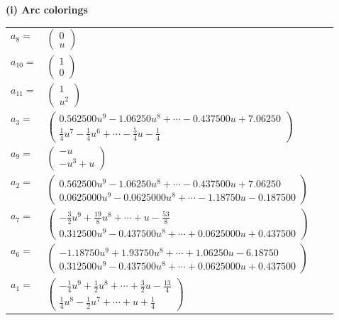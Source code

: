 \documentclass[1p]{elsarticle_modified}
\theoremstyle{definition}
\begin{document}
\flushleft \textbf{(i) Arc colorings}\\
\begin{tabular}{m{7pt} m{180pt} m{7pt} m{180pt} }
\flushright $a_{8}=$&$\begin{pmatrix}0\\u\end{pmatrix}$ \\
\flushright $a_{10}=$&$\begin{pmatrix}1\\0\end{pmatrix}$ \\
\flushright $a_{11}=$&$\begin{pmatrix}1\\u^2\end{pmatrix}$ \\
\flushright $a_{3}=$&$\begin{pmatrix}0.562500 u^{9}-1.06250 u^{8}+\cdots-0.437500 u+7.06250\\\frac{1}{4} u^7-\frac{1}{4} u^6+\cdots-\frac{5}{4} u-\frac{1}{4}\end{pmatrix}$ \\
\flushright $a_{9}=$&$\begin{pmatrix}- u\\- u^3+u\end{pmatrix}$ \\
\flushright $a_{2}=$&$\begin{pmatrix}0.562500 u^{9}-1.06250 u^{8}+\cdots-0.437500 u+7.06250\\0.0625000 u^{9}-0.0625000 u^{8}+\cdots-1.18750 u-0.187500\end{pmatrix}$ \\
\flushright $a_{7}=$&$\begin{pmatrix}-\frac{3}{2} u^9+\frac{19}{8} u^8+\cdots+u-\frac{53}{8}\\0.312500 u^{9}-0.437500 u^{8}+\cdots+0.0625000 u+0.437500\end{pmatrix}$ \\
\flushright $a_{6}=$&$\begin{pmatrix}-1.18750 u^{9}+1.93750 u^{8}+\cdots+1.06250 u-6.18750\\0.312500 u^{9}-0.437500 u^{8}+\cdots+0.0625000 u+0.437500\end{pmatrix}$ \\
\flushright $a_{1}=$&$\begin{pmatrix}-\frac{1}{4} u^9+\frac{1}{2} u^8+\cdots+\frac{3}{2} u-\frac{13}{4}\\\frac{1}{4} u^8-\frac{1}{2} u^7+\cdots+u+\frac{1}{4}\end{pmatrix}$ \\

\end{tabular}
\end{document}
